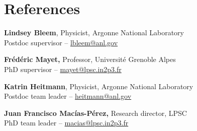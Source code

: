 \section{References}\label{references}

\textbf{Lindsey Bleem}, Physicist, Argonne National Laboratory \\
    \hspace*{20pt} Postdoc supervisor -- \url{lbleem@anl.gov}

\textbf{Fr\'ed\'eric Mayet,} Professor, Universit\'e Grenoble Alpes \\
    \hspace*{20pt} PhD supervisor -- \url{mayet@lpsc.in2p3.fr}

\textbf{Katrin Heitmann}, Physicist, Argonne National Laboratory \\
    \hspace*{20pt} Postdoc team leader -- \url{heitmann@anl.gov}

\textbf{Juan Francisco Mac\'ias-P\'erez,} Research director, LPSC \\
    \hspace*{20pt} PhD team leader -- \url{macias@lpsc.in2p3.fr}
